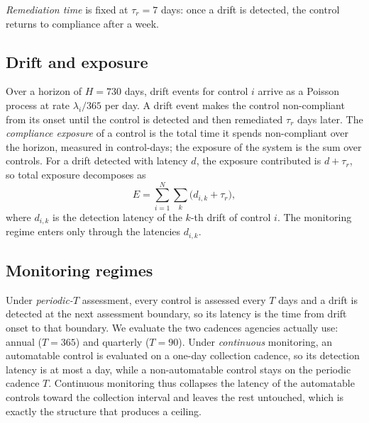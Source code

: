 \documentclass[journal]{IEEEtran}
\begin{document}
\emph{Remediation time} is fixed at $\tau_r = 7$ days: once a drift is detected, the control returns
to compliance after a week.

\subsection{Drift and exposure}
Over a horizon of $H = 730$ days, drift events for control $i$ arrive as a Poisson process at rate
$\lambda_i / 365$ per day. A drift event makes the control non-compliant from its onset until the
control is detected and then remediated $\tau_r$ days later. The \emph{compliance exposure} of a
control is the total time it spends non-compliant over the horizon, measured in control-days; the
exposure of the system is the sum over controls. For a drift detected with latency $d$, the
exposure contributed is $d + \tau_r$, so total exposure decomposes as
\begin{equation}
E = \sum_{i=1}^{N} \sum_{k} \big( d_{i,k} + \tau_r \big),
\end{equation}
where $d_{i,k}$ is the detection latency of the $k$-th drift of control $i$. The monitoring regime
enters only through the latencies $d_{i,k}$.

\subsection{Monitoring regimes}
Under \emph{periodic-$T$} assessment, every control is assessed every $T$ days and a drift is
detected at the next assessment boundary, so its latency is the time from drift onset to that
boundary. We evaluate the two cadences agencies actually use: annual ($T = 365$) and quarterly
($T = 90$). Under \emph{continuous} monitoring, an automatable control is evaluated on a one-day
collection cadence, so its detection latency is at most a day, while a non-automatable control
stays on the periodic cadence $T$. Continuous monitoring thus collapses the latency of the
automatable controls toward the collection interval and leaves the rest untouched, which is exactly
the structure that produces a ceiling.
\end{document}
